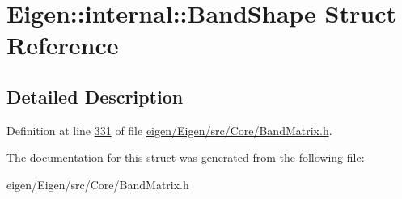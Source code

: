 \hypertarget{struct_eigen_1_1internal_1_1_band_shape}{}\section{Eigen\+:\+:internal\+:\+:Band\+Shape Struct Reference}
\label{struct_eigen_1_1internal_1_1_band_shape}


\subsection{Detailed Description}


Definition at line \hyperlink{eigen_2_eigen_2src_2_core_2_band_matrix_8h_source_l00331}{331} of file \hyperlink{eigen_2_eigen_2src_2_core_2_band_matrix_8h_source}{eigen/\+Eigen/src/\+Core/\+Band\+Matrix.\+h}.



The documentation for this struct was generated from the following file\+:\begin{DoxyCompactItemize}
\item 
eigen/\+Eigen/src/\+Core/\+Band\+Matrix.\+h\end{DoxyCompactItemize}

